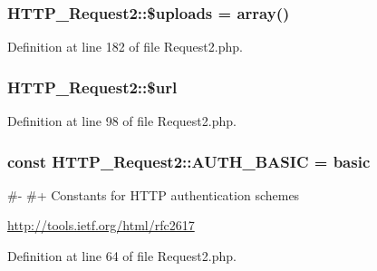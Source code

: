\subsubsection[{\texorpdfstring{\$uploads}{$uploads}}]{\setlength{\rightskip}{0pt plus 5cm}H\+T\+T\+P\+\_\+\+Request2\+::\$uploads = array()\hspace{0.3cm}{\ttfamily [protected]}}\hypertarget{classHTTP__Request2_ad95bfff299ff890d4f554754428337e5}{}\label{classHTTP__Request2_ad95bfff299ff890d4f554754428337e5}


Definition at line 182 of file Request2.\+php.

\subsubsection[{\texorpdfstring{\$url}{$url}}]{\setlength{\rightskip}{0pt plus 5cm}H\+T\+T\+P\+\_\+\+Request2\+::\$url\hspace{0.3cm}{\ttfamily [protected]}}\hypertarget{classHTTP__Request2_acf16b4d76ebd04a80dc8e140303ad895}{}\label{classHTTP__Request2_acf16b4d76ebd04a80dc8e140303ad895}


Definition at line 98 of file Request2.\+php.

\subsubsection[{\texorpdfstring{A\+U\+T\+H\+\_\+\+B\+A\+S\+IC}{AUTH_BASIC}}]{\setlength{\rightskip}{0pt plus 5cm}const H\+T\+T\+P\+\_\+\+Request2\+::\+A\+U\+T\+H\+\_\+\+B\+A\+S\+IC = \textquotesingle{}basic\textquotesingle{}}\hypertarget{classHTTP__Request2_a2282d82f67f929d936b2b2b6c2317dd1}{}\label{classHTTP__Request2_a2282d82f67f929d936b2b2b6c2317dd1}
\#-\/ \#+ Constants for H\+T\+TP authentication schemes

\hyperlink{}{http\+://tools.\+ietf.\+org/html/rfc2617}

Definition at line 64 of file Request2.\+php.

